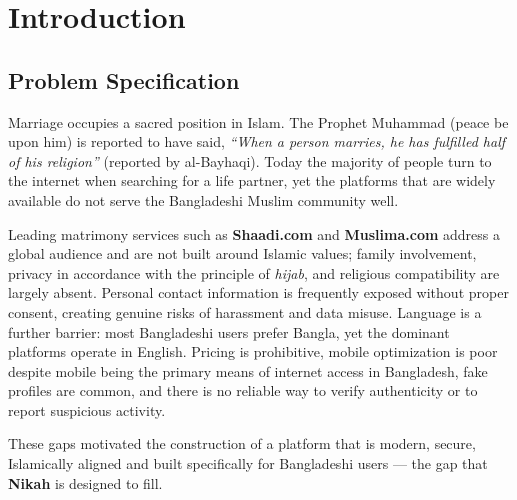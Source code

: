 \documentclass[12pt,a4paper]{report}
\begin{document}
\chapter{Introduction}

\section{Problem Specification}
Marriage occupies a sacred position in Islam. The Prophet Muhammad (peace be
upon him) is reported to have said, \emph{``When a person marries, he has
fulfilled half of his religion''} (reported by al-Bayhaqi). Today the majority
of people turn to the internet when searching for a life partner, yet the
platforms that are widely available do not serve the Bangladeshi Muslim
community well.

Leading matrimony services such as \textbf{Shaadi.com} and \textbf{Muslima.com}
address a global audience and are not built around Islamic values; family
involvement, privacy in accordance with the principle of \emph{hijab}, and
religious compatibility are largely absent. Personal contact information is
frequently exposed without proper consent, creating genuine risks of harassment
and data misuse. Language is a further barrier: most Bangladeshi users prefer
Bangla, yet the dominant platforms operate in English. Pricing is prohibitive,
mobile optimization is poor despite mobile being the primary means of internet
access in Bangladesh, fake profiles are common, and there is no reliable way to
verify authenticity or to report suspicious activity.

These gaps motivated the construction of a platform that is modern, secure,
Islamically aligned and built specifically for Bangladeshi users --- the gap
that \textbf{Nikah} is designed to fill.
\end{document}
